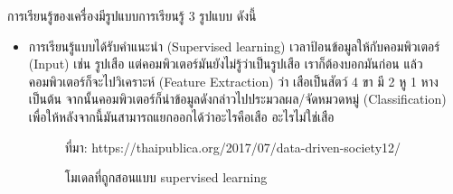การเรียนรู้ของเครื่องมีรูปแบบการเรียนรู้ 3 รูปแบบ ดังนี้
\begin{itemize}[label={--}]
	\item การเรียนรู้แบบได้รับคำแนะนำ (Supervised learning)
	      เวลาป้อนข้อมูลให้กับคอมพิวเตอร์ (Input) เช่น รูปเสือ แต่คอมพิวเตอร์มันยังไม่รู้ว่าเป็นรูปเสือ เราก็ต้องบอกมันก่อน แล้วคอมพิวเตอร์ก็จะไปวิเคราะห์ (Feature Extraction) ว่า เสือเป็นสัตว์ 4 ขา มี 2 หู 1 หาง เป็นต้น จากนั้นคอมพิวเตอร์ก็นำข้อมูลดังกล่าวไปประมวลผล/จัดหมวดหมู่ (Classification) เพื่อให้หลังจากนี้มันสามารถแยกออกได้ว่าอะไรคือเสือ อะไรไม่ใช่เสือ
	
				\begin{figure}[H]
					\caption{โมเดลที่ถูกสอนแบบ supervised learning}{ที่มา: https://thaipublica.org/2017/07/data-driven-society12/}
					\label{Fig:neural}
				\end{figure}
	

\end{itemize}
